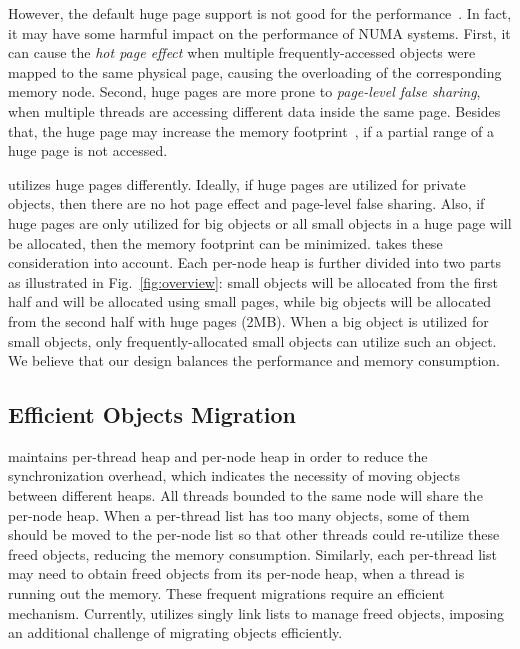 However, the default huge page support is not good for the performance~\cite{Gaud:2014:LPM:2643634.2643659, DBLP:conf/asplos/PanwarBG19}. In fact, it may have some harmful impact on the performance of NUMA systems. First, it can cause the \textit{hot page effect} when multiple frequently-accessed objects  were  mapped  to  the  same  physical  page, causing the overloading of the corresponding memory node. Second, huge pages are more prone to \textit{page-level false sharing}, when multiple threads are accessing different data inside the same page. Besides that, the huge page may increase the memory footprint~\cite{DBLP:conf/asplos/MaasAIJMR20}, if a partial range of a huge page is not accessed. 

\NA{} utilizes huge pages differently. Ideally, if huge pages are utilized for private objects, then there are no hot page effect and page-level false sharing. Also, if huge pages are only utilized for big objects or all small objects in a huge page will be allocated, then the memory footprint can be minimized. \NA{} takes these consideration into account. Each per-node heap is further divided into two parts as illustrated in Fig.~\ref{fig:overview}: small objects will be allocated from the first half and will be allocated using small pages, while big objects will be allocated from the second half with huge pages (2MB). When a big object is utilized for small objects, only frequently-allocated small objects can utilize such an object. We believe that our design balances the performance and memory consumption.   

\subsection{Efficient Objects Migration} 

\NM{} maintains per-thread heap and per-node heap in order to reduce the synchronization overhead, which indicates the necessity of moving objects between different heaps. All threads bounded to the same node will share the per-node heap. When a per-thread list has too many objects, some of them should be moved to the per-node list so that other threads could re-utilize these freed objects, reducing the memory consumption. Similarly, each per-thread list may need to obtain freed objects from its per-node heap, when a thread is running out the memory. These frequent migrations require an efficient mechanism. Currently, \NM{} utilizes singly link lists to manage freed objects, imposing an additional challenge of migrating objects efficiently. 

